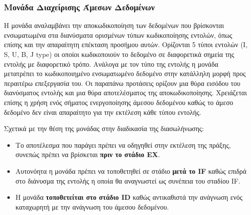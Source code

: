 \documentclass[11pt]{extarticle}
\begin{document}
\subsubsection{Μονάδα Διαχείρισης Άμεσων Δεδομένων}
 Η μονάδα αναλαμβάνει την αποκωδικοποίηση των δεδομένων που βρίσκονται ενσωματωμένα στα διανύσματα ορισμένων τύπων κωδικοποίησης εντολών, όπως επίσης και την απαραίτητη επέκταση προσήμου αυτών.
 Ορίζονται 5 τύποι εντολών (I, S, U, B, J type) οι οποίοι κωδικοποιούν το δεδομένο σε διαφορετικά σημεία της εντολής με διαφορετικό τρόπο.
 Ανάλογα με τον τύπο της εντολής η μονάδα μετατρέπει το κωδικοποιημένο ενσωματωμένο δεδομένο στην κατάλληλη μορφή προς περαιτέρω επεξεργασία του.
 Οι παραπάνω προτάσεις ορίζουν μια θύρα εισόδου του διανύσματος εντολής και μια θύρα αποτελέσματος της αποκωδικοποίησης.
 Χρειάζεται επίσης η χρήση ενός σήματος ενεργοποίησης άμεσου δεδομένου καθώς το άμεσο δεδομένο δεν είναι απαραίτητο για την εκτέλεση κάθε τύπου εντολής.

Σχετικά με την θέση της μονάδας στην διαδικασία της διασωλήνωσης:
 \begin{itemize}
    \item Το αποτέλεσμα που παράγει πρέπει να οδηγηθεί στην εκτέλεση της πράξης, συνεπώς πρέπει να βρίσκεται \textbf{πριν το στάδιο EX}.
    \item Αυτονόητα η μονάδα πρέπει να τοποθετηθεί σε στάδιο \textbf{μετά το IF} καθώς επιδρά στο διάνυσμα της εντολής η οποία θα αναγνωστεί ως συνέπεια του σταδίου IF.
    \item Η μονάδα \textbf{τοποθετείται στο στάδιο ID} καθώς αντικαθιστά την ανάγνωση ενός καταχωρητή με την ανάγνωση του άμεσου δεδομένου.
 \end{itemize}
\end{document}
